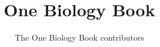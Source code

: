 \documentclass[11pt,a4paper,twoside,openany]{book}
\title{One Biology Book}
\author{The One Biology Book contributors}
\date{\bookdate}
\begin{document}
\frontmatter




\tableofcontents

\mainmatter





\appendix
\part{\omsolutionspart}




\backmatter
\renewcommand{\indexspace}{\par\vskip 8pt plus 4pt minus 4pt\relax}
\printindex
\end{document}
